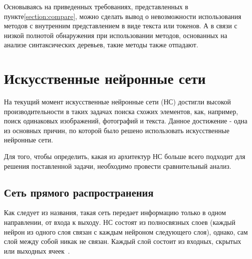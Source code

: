 Основываясь на приведенных требованиях, представленных в пункте\ref{section:compare}, можно сделать вывод о невозможности использования методов с внутренним представлением в виде текста или токенов. А в связи с низкой полнотой обнаружения при использовании методов, основанных на анализе синтаксических деревьев, такие методы также отпадают.
% 
% 

\section{Искусственные нейронные сети}

На текущий момент искусственные нейронные сети (НС) достигли высокой производительности в таких задачах поиска схожих элементов, как, например, поиск одинаковых изображений, фотографий и текста. Данное достижение - одна из основных причин, по которой было решено использовать искусственные нейронные сети.


Для того, чтобы определить, какая из архитектур НС больше всего подходит для решения поставленной задачи, необходимо провести сравнительный анализ. 

\subsection{Сеть прямого распространения}

Как следует из названия, такая сеть передает информацию только в одном направлении, от входа к выходу. НС состоят из полносвязных слоев (каждый нейрон из одного слоя связан с каждым нейроном следующего слоя), однако, сам слой между собой никак не связан. Каждый слой состоит из входных, скрытых или выходных ячеек~\cite{perceptron}. 

